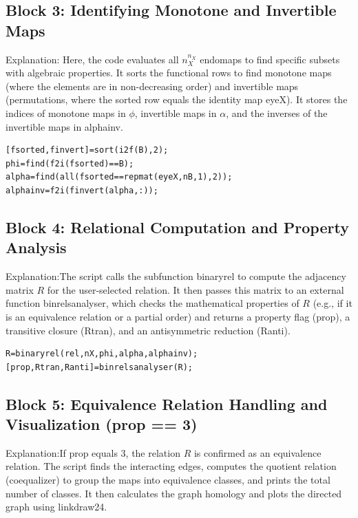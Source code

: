 \subsection*{ \hspace*{0.2cm} Block 3: Identifying Monotone and Invertible Maps}
 Explanation: Here, the code evaluates all $n_X^{n_X}$ endomaps to find specific subsets with algebraic properties. It sorts the functional rows to find monotone maps (where the elements are in non-decreasing order) and invertible maps (permutations, where the sorted row equals the identity map eyeX). It stores the indices of monotone maps in $\phi$, invertible maps in $\alpha$, and the inverses of the invertible maps in alphainv.
 
\begin{lstlisting}
[fsorted,finvert]=sort(i2f(B),2);
phi=find(f2i(fsorted)==B); 
alpha=find(all(fsorted==repmat(eyeX,nB,1),2)); 
alphainv=f2i(finvert(alpha,:));
\end{lstlisting}



\subsection*{ \hspace*{0.2cm} Block 4: Relational Computation and Property Analysis}
 Explanation:The script calls the subfunction binaryrel to compute the adjacency matrix $R$ for the user-selected relation. It then passes this matrix to an external function binrelsanalyser, which checks the mathematical properties of $R$ (e.g., if it is an equivalence relation or a partial order) and returns a property flag (prop), a transitive closure (Rtran), and an antisymmetric reduction (Ranti).

 \begin{lstlisting}
R=binaryrel(rel,nX,phi,alpha,alphainv);
[prop,Rtran,Ranti]=binrelsanalyser(R);
\end{lstlisting}



\subsection*{ \hspace*{0.2cm} Block 5: Equivalence Relation Handling and Visualization (prop == 3)}
 Explanation:If prop equals 3, the relation $R$ is confirmed as an equivalence relation. The script finds the interacting edges, computes the quotient relation (coequalizer) to group the maps into equivalence classes, and prints the total number of classes. It then calculates the graph homology and plots the directed graph using linkdraw24.

